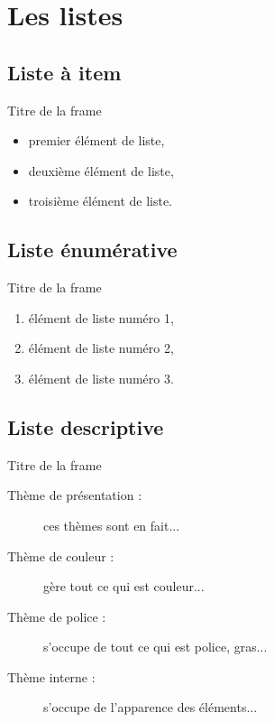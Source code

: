 \documentclass{bredelebeamer}
\begin{document}
\section{Les listes}
	\subsection{Liste à item}

\begin{frame}{Titre de la frame}

	\begin{itemize}
		\item premier élément de liste,
		\item deuxième élément de liste,
		\item troisième élément de liste.
	\end{itemize}
\end{frame} 

		\subsection{Liste énumérative} 
\begin{frame}{Titre de la frame} 
	\begin{enumerate}
		\item élément de liste numéro 1,
		\item élément de liste numéro 2,
		\item élément de liste numéro 3.  
	\end{enumerate}
\end{frame}


		\subsection{Liste descriptive} 
\begin{frame}{Titre de la frame} 
	\begin{description}
		\item [Thème de présentation : ] ces thèmes sont en fait...
		\item [Thème de couleur : ] gère tout ce qui est couleur...
		\item [Thème de police : ] s'occupe de tout ce qui est police, gras...
		\item [Thème interne : ] s'occupe de l'apparence des éléments...
	\end{description}
\end{frame}
\end{document}
